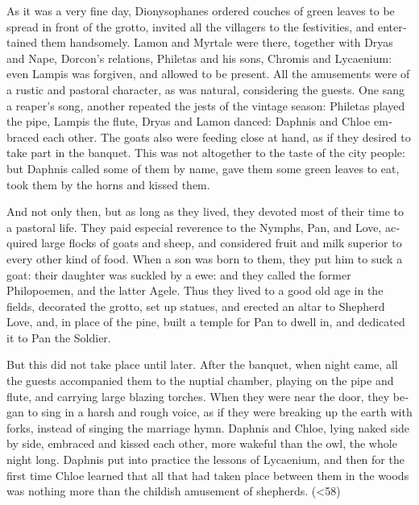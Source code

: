 \documentclass{book}
\begin{document}
\begin{pairs}
\begin{Rightside}
\begin{english}
  As it was a very fine day, Dionysophanes ordered couches of green leaves to be spread in front of the grotto, invited all the villagers to the festivities, and entertained them handsomely.  Lamon and Myrtale were there, together with Dryas and Nape, Dorcon's relations, Philetas and his sons, Chromis and Lycaenium: even Lampis was forgiven, and allowed to be present.  All the amusements were of a rustic and pastoral character, as was natural, considering the guests.  One sang a reaper's song, another repeated the jests of the vintage season: Philetas played the pipe, Lampis the flute, Dryas and Lamon danced: Daphnis and Chloe embraced each other.  The goats also were feeding close at hand, as if they desired to take part in the banquet.  This was not altogether to the taste of the city people: but Daphnis called some of them by name, gave them some green leaves to eat, took them by the horns and kissed them.
\pend


  And not only then, but as long as they lived, they devoted most of their time to a pastoral life.  They paid especial reverence to the Nymphs, Pan, and Love, acquired large flocks of goats and sheep, and considered fruit and milk superior to every other kind of food.  When a son was born to them, they put him to suck a goat: their daughter was suckled by a ewe: and they called the former Philopoemen, and the latter Agele.  Thus they lived to a good old age in the fields, decorated the grotto, set up statues, and erected an altar to Shepherd Love, and, in place of the pine, built a temple for Pan to dwell in, and dedicated it to Pan the Soldier.
\pend


  But this did not take place until later.  After the banquet, when night came, all the guests accompanied them to the nuptial chamber, playing on the pipe and flute, and carrying large blazing torches.  When they were near the door, they began to sing in a harsh and rough voice, as if they were breaking up the earth with forks, instead of singing the marriage hymn.  Daphnis and Chloe, lying naked side by side, embraced and kissed each other, more wakeful than the owl, the whole night long.  Daphnis put into practice the lessons of Lycaenium, and then for the first time Chloe learned that all that had taken place between them in the woods was nothing more than the childish amusement of shepherds.  (<58)
\pend

\endnumbering
\end{english}

\end{Rightside}





\end{pairs}
\end{document}
